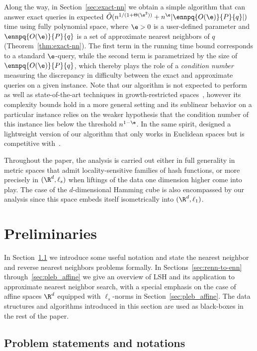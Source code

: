 Along the way, in Section~\ref{sec:exact-nn} we obtain a simple
algorithm that can answer exact \nn queries in expected $\tilde
O(n^{1/(1+\Theta(\e^2))} + n^\e |\ennpq{O(\e)}{P}{q}|)$ time using
fully polynomial space, where $\e>0$ is a user-defined parameter and
$\ennpq{O(\e)}{P}{q}$ is a set of approximate nearest neighbors of $q$
(Theorem~\ref{thm:exact-nn}). The first term in the running time bound
corresponds to a standard $\e$-\nn query, while the second term is
parametrized by the size of $\ennpq{O(\e)}{P}{q}$, which thereby plays
the role of a {\em condition number} measuring the discrepancy in
difficulty between the exact and approximate \nn queries on a given
instance. Note that our algorithm is not expected to perform as well
as state-of-the-art techniques in growth-restricted
spaces~\cite{Clarkson99, hkmr-nnngrm-04, kr-fnngrm-02, kl-ns-04},
however its complexity bounds hold in a more general setting and its
sublinear behavior on a particular instance relies on the weaker
hypothesis that the condition number of this instance lies below the
threshold $n^{1-\e}$. In the same spirit, \citet{DIIM04} designed a
lightweight version of our algorithm that only works in Euclidean
spaces but is competitive with~\cite{Clarkson99, hkmr-nnngrm-04,
  kr-fnngrm-02, kl-ns-04}.

Throughout the paper, the analysis is carried out either in full
generality in metric spaces that admit locality-sensitive families of
hash functions, or more precisely in $(\R^d, \ell_s)$ when liftings of
the data one dimension higher come into play.  The case of the
$d$-dimensional Hamming cube is also encompassed by our analysis since
this space embeds itself isometrically into $(\R^d, \ell_1)$.


\section{Preliminaries}\label{sec:prelim}

In Section~\ref{sec:defs} we introduce some useful notation and state
the nearest neighbor and reverse nearest neighbors problems
formally. In Sections~\ref{sec:renn-to-enn}
through~\ref{sec:pleb_affine} we give an overview of LSH and its
application to approximate nearest neighbor search, with a special
emphasis on the case of affine spaces $\R^d$ equipped with
$\ell_s$-norms in Section~\ref{sec:pleb_affine}. The data structures
and algorithms introduced in this section are used as black-boxes in
the rest of the paper.

\subsection{Problem statements and notations}
\label{sec:defs}

